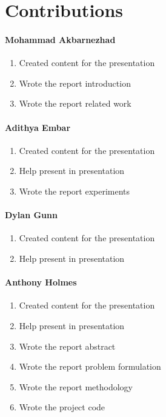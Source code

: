 \section{Contributions}

\paragraph{Mohammad Akbarnezhad}
\begin{enumerate}
    \item Created content for the presentation
    \item Wrote the report introduction
    \item Wrote the report related work
\end{enumerate}

\paragraph{Adithya Embar}
\begin{enumerate}
    \item Created content for the presentation
    \item Help present in presentation
    \item Wrote the report experiments 
\end{enumerate}

\paragraph{Dylan Gunn}
\begin{enumerate}
    \item Created content for the presentation
    \item Help present in presentation

\end{enumerate}

\paragraph{Anthony Holmes}
\begin{enumerate}
    \item Created content for the presentation
    \item Help present in presentation
    \item Wrote the report abstract
    \item Wrote the report problem formulation
    \item Wrote the report methodology
    \item Wrote the project code
    
\end{enumerate}
